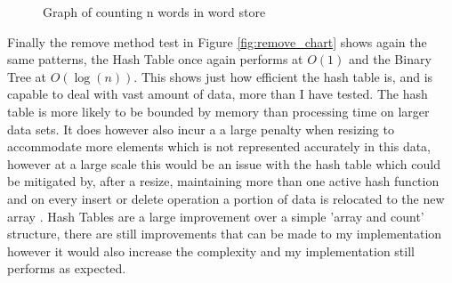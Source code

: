 \documentclass[12pt]{article}
\begin{document}
\begin{figure}[!htb]
\caption[The LOF caption]{Graph of counting n words in word store\footnotemark[1]}
\label{fig:count_chart}
\end{figure}

Finally the remove method test in Figure \ref{fig:remove_chart} shows again the same patterns, the Hash Table once again performs at $O(1)$ and the Binary Tree at $O(\log(n))$. This shows just how efficient the hash table is, and is capable to deal with vast amount of data, more than I have tested. The hash table is more likely to be bounded by memory than processing time on larger data sets. It does however also incur a a large penalty when resizing to accommodate more elements which is not represented accurately in this data, however at a large scale this would be an issue with the hash table which could be mitigated by, after a resize, maintaining more than one active hash function and on every insert or delete operation a portion of data is relocated to the new array \cite{resizinghashtables}.
Hash Tables are a large improvement over a simple 'array and count' structure, there are still improvements that can be made to my implementation however it would also increase the complexity and my implementation still performs as expected.
\end{document}
